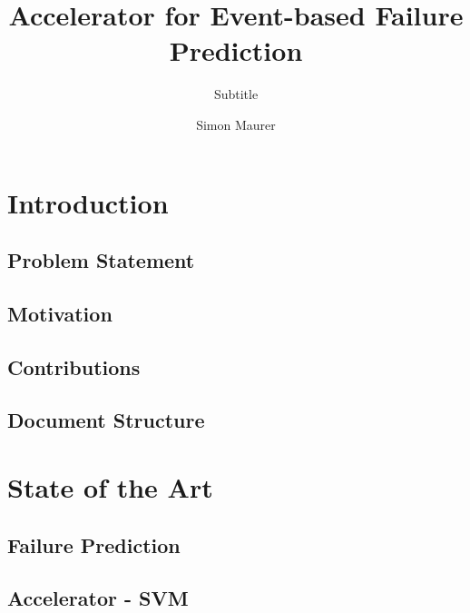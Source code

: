 \documentclass[mscthesis]{usiinfthesis}
\title{Accelerator for Event-based Failure Prediction} %
\subtitle{Subtitle} %
\author{Simon Maurer} %
\begin{document}
\maketitle %

\frontmatter %

\begin{abstract}

\lipsum
\end{abstract}

%

\begin{acknowledgements}
\lipsum 
\end{acknowledgements}

\tableofcontents 
\listoffigures %
\listoftables %

\mainmatter

\chapter{Introduction}
\section{Problem Statement}
\section{Motivation}
\section{Contributions}
\section{Document Structure}

\chapter{State of the Art}
\section{Failure Prediction}
\section{Accelerator - SVM}
\end{document}
